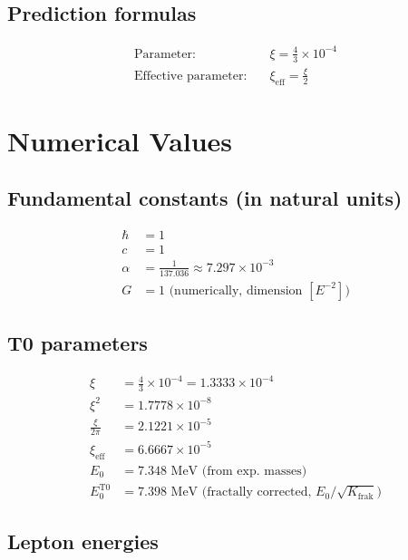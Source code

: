 	\subsection{Prediction formulas}
	
	\begin{align}
		\text{Parameter:} \quad & \xi = \frac{4}{3} \times 10^{-4} \\
		\text{Effective parameter:} \quad & \xi_{\text{eff}} = \frac{\xi}{2}
	\end{align}
	
	\section{Numerical Values}
	\label{sec:numerical_values}
	
	\subsection{Fundamental constants (in natural units)}
	
	\begin{align}
		\hbar &= 1 \\
		c &= 1 \\
		\alpha &= \frac{1}{137.036} \approx 7.297 \times 10^{-3} \\
		G &= 1 \text{ (numerically, dimension } [E^{-2}]\text{)}
	\end{align}
	
	\subsection{T0 parameters}
	
	\begin{align}
		\xi &= \frac{4}{3} \times 10^{-4} = 1.3333 \times 10^{-4} \\
		\xi^2 &= 1.7778 \times 10^{-8} \\
		\frac{\xi}{2\pi} &= 2.1221 \times 10^{-5} \\
		\xi_{\text{eff}} &= 6.6667 \times 10^{-5} \\
		E_0 &= 7.348 \text{ MeV (from exp. masses)} \\
		E_0^{\text{T0}} &= 7.398 \text{ MeV (fractally corrected, } E_0/\sqrt{K_{\text{frak}}}\text{)}
	\end{align}
	
	\subsection{Lepton energies}
	
